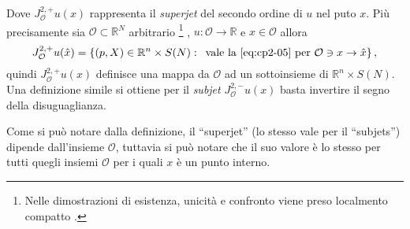 Dove $J_{\mathcal{O}}^{2,+}u(x)$ rappresenta il \emph{superjet} del secondo ordine di $u$ nel puto $x$. Più precisamente sia $\mathcal{O}\subset\mathbb{R}^N$ arbitrario%
\footnote{Nelle dimostrazioni di esistenza, unicità e confronto viene preso localmento compatto \cite[vedi][10 §1]{crand:lion}.}
,  $u:\mathcal{O}\to\mathbb{R}$ e $\hat{x}\in\mathcal{O}$ allora
\[
J_{\mathcal{O}}^{2,+}u(\hat{x}) = \left\{(p,X)\in\mathbb{R}^n\times S(N):\,\text{ vale la \eqref{eq:cp2-05} per }\mathcal{O}\ni x\to\hat{x}\right\},
\]
quindi $J_{\mathcal{O}}^{2,+}u(x)$ definisce una mappa da $\mathcal{O}$ ad un sottoinsieme di $\mathbb{R}^n\times S(N)$. Una definizione simile si ottiene per il \emph{subjet} $J_{\mathcal{O}}^{2,-}u(x)$ basta invertire il segno della disuguaglianza.
\begin{osservazione}
Come si può notare dalla definizione, il ``superjet'' (lo stesso vale per il ``subjets'') dipende dall'insieme $\mathcal{O}$, tuttavia si può notare che il suo valore è lo stesso per tutti quegli insiemi $\mathcal{O}$ per i quali $x$ è un punto interno.  
\end{osservazione}

